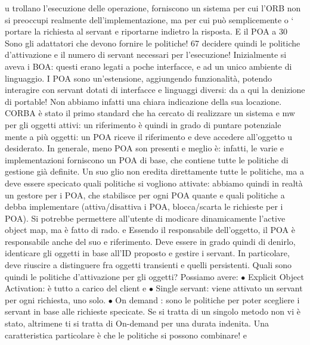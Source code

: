 u
trollano l'esecuzione delle operazione, forniscono un sistema per cui l'ORB non
si preoccupi realmente dell'implementazione, ma per cui può semplicemente
o
`
portare la richiesta al servant e riportarne indietro la risposta. E il POA a
30 Sono
gli adattatori che devono fornire le politiche!
67
decidere quindi le politiche d'attivazione e il numero di servant necessari per
l'esecuzione!
Inizialmente si aveva i BOA: questi erano legati a poche interfacce, e ad un
unico ambiente di linguaggio. I POA sono un'estensione, aggiungendo funzionalità, potendo interagire con servant dotati
di interfacce e linguaggi diversi: da
a
qui la denizione di portable! Non abbiamo infatti una chiara indicazione della
sua locazione.
CORBA è stato il primo standard che ha cercato di realizzare un sistema
e
mw per gli oggetti attivi: un riferimento è quindi in grado di puntare potenziale
mente a più oggetti: un POA riceve il riferimento e deve accedere all'oggetto
u
desiderato. In generale, meno POA son presenti e meglio è: infatti, le varie
e
implementazioni forniscono un POA di base, che contiene tutte le politiche di
gestione già definite. Un suo glio non eredita direttamente tutte le politiche, ma
a
deve essere specicato quali politiche si vogliono attivate: abbiamo quindi in realtà un gestore per i POA, che
stabilisce per ogni POA quante e quali politiche
a
debba implementare (attiva/disattiva i POA, blocca/scarta le richieste per i
POA). Si potrebbe permettere all'utente di modicare dinamicamente l'active
object map, ma è fatto di rado.
e
Essendo il responsabile dell'oggetto, il POA è responsabile anche del suo
e
riferimento. Deve essere in grado quindi di denirlo, identicare gli oggetti in
base all'ID proposto e gestire i servant. In particolare, deve riuscire a distinguere
fra oggetti transienti e quelli persistenti.
Quali sono quindi le politiche d'attivazione per gli oggetti? Possiamo avere:
$\bullet$ Explicit Object Activation: è tutto a carico del client
e
$\bullet$ Single servant: viene attivato un servant per ogni richiesta, uno solo.
$\bullet$ On demand : sono le politiche per poter scegliere i servant in base alle richieste specicate. Se si tratta di
un singolo metodo non vi è stato, altrimene
ti si tratta di On-demand per una durata indenita. Una caratteristica
particolare è che le politiche si possono combinare!
e
